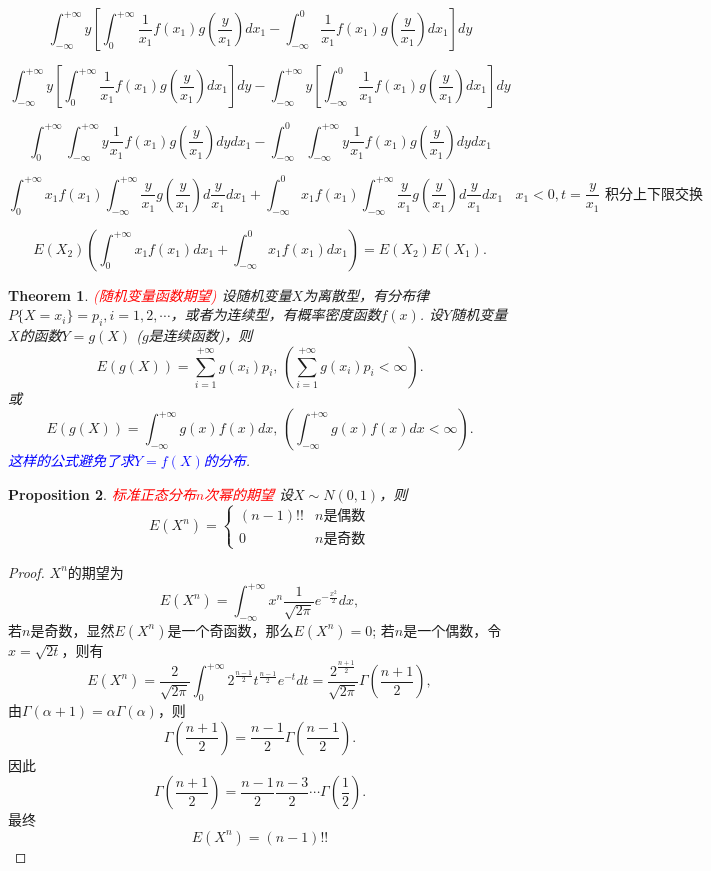 \documentclass{article}
\newtheorem{theorem}{Theorem}[section]
\newtheorem{proposition}[theorem]{Proposition}
\newcommand{\redt}[1]{\textcolor{red}{#1}}
\newcommand{\bluet}[1]{\textcolor{blue}{#1}}
\begin{document}

$$
\int_{-\infty}^{+\infty}y \left[\int_0^{+\infty} \frac{1}{x_1}f(x_1)g(\frac{y}{x_1})dx_1 - \int_{-\infty}^0 \frac{1}{x_1}f(x_1)g(\frac{y}{x_1})dx_1 \right]dy
$$

$$
\int_{-\infty}^{+\infty}y \left[\int_0^{+\infty} \frac{1}{x_1}f(x_1)g(\frac{y}{x_1})dx_1\right]dy - \int_{-\infty}^{+\infty}y\left[\int_{-\infty}^0 \frac{1}{x_1}f(x_1)g(\frac{y}{x_1})dx_1 \right]dy
$$

$$
\int_0^{+\infty}\int_{-\infty}^{+\infty} y\frac{1}{x_1}f(x_1)g(\frac{y}{x_1})dydx_1 - \int_{-\infty}^0\int_{-\infty}^{+\infty} y\frac{1}{x_1}f(x_1)g(\frac{y}{x_1})dydx_1
$$

$$
\int_0^{+\infty}x_1f(x_1)\int_{-\infty}^{+\infty}\frac{y}{x_1}g(\frac{y}{x_1})d\frac{y}{x_1}dx_1 + \int_{-\infty}^0x_1f(x_1)\int_{-\infty}^{+\infty} \frac{y}{x_1}g(\frac{y}{x_1})d\frac{y}{x_1}dx_1 ~~~~ \text{$x_1 < 0, t=\frac{y}{x_1}$ 积分上下限交换}
$$

$$
E(X_2)\left(\int_0^{+\infty}x_1f(x_1)dx_1 +\int_{-\infty}^0x_1f(x_1)dx_1\right) = E(X_2)E(X_1).
$$


\begin{theorem}
\rm \redt{(随机变量函数期望)} 设随机变量$X$为离散型，有分布律$P\{X=x_i\}=p_i,i=1,2,\cdots$，或者为连续型，有概率密度函数$f(x)$. 设$Y$随机变量$X$的函数$Y=g(X)$ ($g$是连续函数)，则
$$
E(g(X))=\sum\limits_{i=1}^{+\infty}g(x_i)p_i,\,\left(\sum\limits_{i=1}^{+\infty}g(x_i)p_i < \infty \right) .
$$
或
$$
E(g(X)) = \int_{-\infty}^{+\infty}g(x)f(x)dx,\, \left(\int_{-\infty}^{+\infty}g(x)f(x)dx < \infty\right).
$$
\bluet{这样的公式避免了求$Y=f(X)$的分布}.
\end{theorem}

\begin{proposition}
\rm \redt{标准正态分布$n$次幂的期望} 设$X \sim N(0,1)$，则
$$
E(X^n) = \left\{  \begin{array}{ll}
(n-1)!! & n\text{是偶数} \\
0	& n\text{是奇数} 
\end{array} \right.
$$
\end{proposition}

\begin{proof}
$X^n$的期望为
$$
E(X^n) = \int_{-\infty}^{+\infty} x^n \frac{1}{\sqrt{2\pi}}e^{-\frac{x^2}{2}}dx,
$$
若$n$是奇数，显然$E(X^n)$是一个奇函数，那么$E(X^n)=0$; 若$n$是一个偶数，令$x=\sqrt{2t}$，则有
$$
E(X^n) = \frac{2}{\sqrt{2\pi}} \int_{0}^{+\infty} 2^{\frac{n-1}{2}}t^{\frac{n-1}{2}}e^{-t}dt = \frac{2^{\frac{n+1}{2}}}{\sqrt{2\pi}} \Gamma(\frac{n+1}{2}),
$$
由$\Gamma(\alpha+1) = \alpha \Gamma(\alpha)$，则
$$
\Gamma(\frac{n+1}{2}) = \frac{n-1}{2}\Gamma(\frac{n-1}{2}).
$$
因此
$$
\Gamma(\frac{n+1}{2}) = \frac{n-1}{2} \frac{n-3}{2} \cdots \Gamma(\frac{1}{2}). 
$$
最终
$$
E(X^n) = (n-1)!!
$$
\end{proof}
\end{document}
